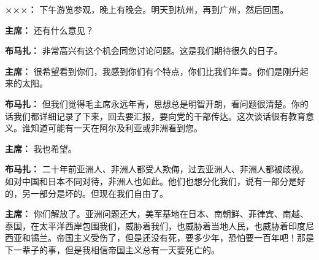 \begin{duihua}
\item[\textbf{×××：}] 下午游览参观，晚上有晚会。明天到杭州，再到广州，然后回国。

\item[\textbf{主席：}] 还有什么意见？

\item[\textbf{布马扎：}] 非常高兴有这个机会同您讨论问题。这是我们期待很久的日子。

\item[\textbf{主席：}] 很希望看到你们，我感到你们有个特点，你们比我们年青。你们是刚升起来的太阳。

\item[\textbf{布马扎：}] 但我们觉得毛主席永远年青，思想总是明智开朗，看问题很清楚。你的话我们都详细记录了下来，回去要汇报，要向党的干部传达。这次谈话很有教育意义。谁知道可能有一天在阿尔及利亚或非洲看到您。

\item[\textbf{主席：}] 我也希望。

\item[\textbf{布马扎：}] 二十年前亚洲人、非洲人都受人欺侮，过去亚洲人、非洲人都被歧视。如对中国和日本不同对待，非洲人也如此。他们也想分化我们，说有一部分是好的，另一部分是坏的。但现在我们自由了。

\item[\textbf{主席：}] 你们解放了。亚洲问题还大，美军基地在日本、南朝鲜、菲律宾、南越、泰国，在太平洋西岸包围我们，威胁着我们，也威胁着当地人民，也威胁着印度尼西亚和锡兰。帝国主义受伤了，但是还没有死，要多少年，恐怕要一百年吧！那是下一辈子的事，但是我相信帝国主义总有一天要死亡的。
\end{duihua}
